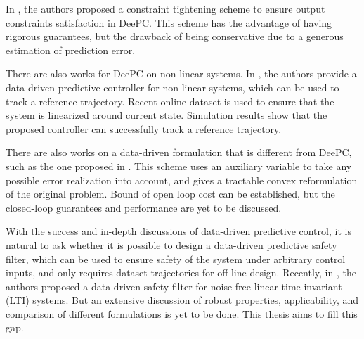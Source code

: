 In \cite{berberich_data-driven-robust_2021}, the authors proposed a constraint tightening scheme to ensure output constraints satisfaction in DeePC.
This scheme has the advantage of having rigorous guarantees, but the drawback of being conservative due to a generous estimation of prediction error.

There are also works for DeePC on non-linear systems.
In \cite{berberich_track_data_2022}, the authors provide a data-driven predictive controller for non-linear systems, which can be used to track a reference trajectory.
Recent online dataset is used to ensure that the system is linearized around current state.
Simulation results show that the proposed controller can successfully track a reference trajectory.

There are also works on a data-driven formulation that is different from DeePC, such as the one proposed in \cite{huang_robust_2023}.
This scheme uses an auxiliary variable to take any possible error realization into account, and gives a tractable convex reformulation of the original problem.
Bound of open loop cost can be established, but the closed-loop guarantees and performance are yet to be discussed.

With the success and in-depth discussions of data-driven predictive control, it is natural to ask whether it is possible to design a data-driven predictive safety filter, which can be used to ensure safety of the system under arbitrary control inputs, and only requires dataset trajectories for off-line design.
Recently, in \cite{bajelani_data-driven_2023}, the authors proposed a data-driven safety filter for noise-free linear time invariant (LTI) systems.
But an extensive discussion of robust properties, applicability, and comparison of different formulations is yet to be done.
This thesis aims to fill this gap.

